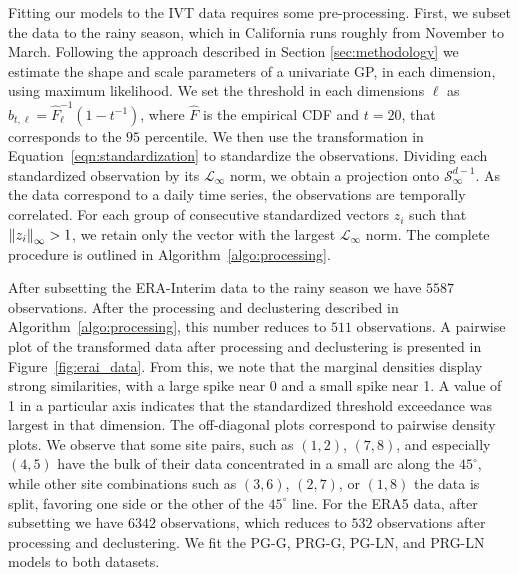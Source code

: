 Fitting our models to the IVT data requires some pre-processing. First, we subset the data to the rainy
  season, which in California runs roughly from November to March.  Following the approach described 
  in Section \ref{sec:methodology} we estimate the shape and scale parameters of a univariate GP, in each
  dimension, using maximum likelihood. We set the threshold in each dimensions $\ell$ as  
  $b_{t,\ell} = \hat{F}_{\ell}^{-1}(1 - t^{-1})$, where $\hat{F}$ is the empirical CDF and $t=20$, 
  that corresponds to the $95$ percentile. We then use the transformation in Equation~\eqref{eqn:standardization} 
  to standardize the observations.  Dividing each standardized observation
  by its $\mathcal{L}_{\infty}$ norm, we obtain a projection onto $\mathcal{S}_{\infty}^{d-1}$. As 
  the data correspond to a daily time series, the observations are temporally correlated.  For each
  group of consecutive standardized vectors $z_i$ such  that  $\inorm{z_i} > 1$, we retain only the
  vector with the largest $\mathcal{L}_{\infty}$ norm.  The complete procedure is outlined in
  Algorithm~\ref{algo:processing}.  
  
After subsetting the ERA-Interim data to the rainy season we 
  have $5587$ observations. After the processing and declustering described in
  Algorithm~\ref{algo:processing}, this number reduces to $511$ observations. A pairwise plot 
  of the transformed data after processing and declustering is presented in 
  Figure~\ref{fig:erai_data}.  From this, we note that the marginal densities display strong
  similarities, with a large spike near 0 and a small spike near 1. A value of 1 in a particular 
  axis indicates that the standardized threshold exceedance was largest in that dimension.  
  The off-diagonal plots correspond to pairwise density plots.  We observe that some site pairs, such 
  as $(1,2)$, $(7,8)$, and especially $(4,5)$ have the bulk of their data concentrated in a 
  small arc along the $45^{\circ}$, while other site combinations such as $(3,6)$, $(2,7)$, or
  $(1,8)$ the data is split, favoring one side or the other of the $45^{\circ}$ line. For the 
  ERA5 data, after subsetting we have $6342$ observations, which reduces to $532$ observations 
  after processing and declustering. We fit the PG-G, PRG-G, PG-LN, and PRG-LN models to 
  both datasets.

%   

